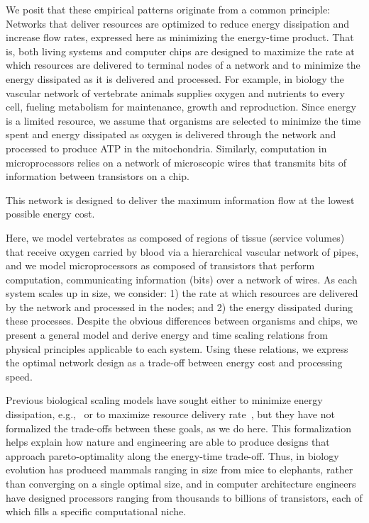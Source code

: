 \documentclass[12pt]{article}
\begin{document}
We posit that these empirical patterns originate from a common principle:
Networks that deliver resources are optimized to reduce energy dissipation and
increase flow rates, expressed here as minimizing the energy-time product. That
is, both living systems and computer chips are designed to maximize the rate at
which resources are delivered to terminal nodes of a network and to minimize
the energy dissipated as it is delivered and processed.  For example, in biology the vascular network of vertebrate
animals supplies oxygen and nutrients to every cell, fueling metabolism for
maintenance, growth and reproduction.  Since energy is a limited resource, we
assume that organisms are selected to minimize the time spent and energy dissipated as oxygen is delivered through the network \cite{west97} and processed to produce ATP in the mitochondria. Similarly, computation in microprocessors relies on a
network of microscopic wires that transmits bits of information between
transistors on a chip.  

This network is designed to deliver the maximum information
flow at the lowest possible energy cost.

Here, we model vertebrates as composed of regions of tissue (service
volumes) that receive oxygen
carried by blood via a hierarchical vascular network of pipes, and we model
microprocessors as composed of transistors that perform computation, communicating
information (bits) over a network of wires.  As each system scales up in size,
we consider: 1) the rate at which resources are delivered by the network and
processed in the nodes; and 2) the energy dissipated during these processes.
Despite the obvious differences between organisms and chips, we present a
general model and derive energy and time scaling relations from physical
principles applicable to each system. Using these relations, we express the
optimal network design as a trade-off between energy cost and processing speed. 


Previous biological scaling models have sought either to minimize energy dissipation, e.g.,~\cite{west97} or to maximize resource delivery rate~\cite{banavar10}, but they have
not formalized the trade-offs between these goals, as we do here.  This formalization
helps explain how nature and engineering are able to produce designs that
approach pareto-optimality along the energy-time trade-off.  Thus, in biology
evolution has produced mammals ranging in size from mice to elephants, rather
than converging on a single optimal size, and in computer architecture
engineers have designed processors ranging from thousands to
billions of transistors, each of which fills a specific computational niche.
\end{document}
